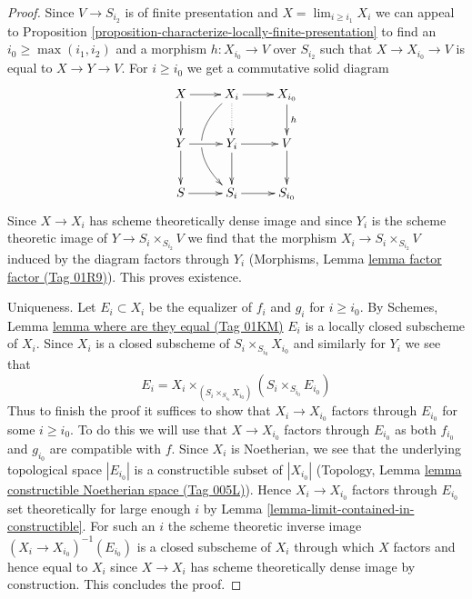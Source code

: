 \documentclass{amsart}
\theoremstyle{plain}
\theoremstyle{definition}
\theoremstyle{remark}
\numberwithin{equation}{subsection}
\def\lim{\mathop{\mathrm{lim}}\nolimits}
\begin{document}
\begin{proof}
Since $V \to S_{i_2}$ is of finite presentation and
$X = \lim_{i \geq i_1} X_i$ we can appeal to Proposition
\ref{proposition-characterize-locally-finite-presentation}
to find an $i_0 \geq \max(i_1, i_2)$ and a morphism $h : X_{i_0} \to V$
over $S_{i_2}$ such that $X \to X_{i_0} \to V$ is equal to $X \to Y \to V$.
For $i \geq i_0$ we get a commutative solid diagram
$$
\xymatrix{
X \ar[d] \ar[r] &
X_i \ar[r] \ar@{..>}[d] \ar@/_2pc/[dd] |!{[d];[ld]}\hole &
X_{i_0} \ar[d]^h \\
Y \ar[r] \ar[d] & Y_i \ar[r] \ar[d] & V \ar[d] \\
S \ar[r] & S_i \ar[r] & S_{i_0}
}
$$
Since $X \to X_i$ has scheme theoretically dense image
and since $Y_i$ is the scheme theoretic image of
$Y \to S_i \times_{S_{i_2}} V$
we find that the morphism $X_i \to S_i \times_{S_{i_2}} V$
induced by the diagram
factors through $Y_i$ (Morphisms, Lemma \href{https://stacks.math.columbia.edu/tag/01R9}{lemma factor factor (Tag 01R9)}).
This proves existence.

\medskip\noindent
Uniqueness. Let $E_i \subset X_i$ be the equalizer of $f_i$ and $g_i$
for $i \geq i_0$. By
Schemes, Lemma \href{https://stacks.math.columbia.edu/tag/01KM}{lemma where are they equal (Tag 01KM)}
$E_i$ is a locally closed subscheme of $X_i$.
Since $X_i$ is a closed subscheme of $S_i \times_{S_{i_0}} X_{i_0}$
and similarly for $Y_i$ we see that
$$
E_i = X_i \times_{(S_i \times_{S_{i_0}} X_{i_0})} (S_i \times_{S_{i_0}} E_{i_0})
$$
Thus to finish the proof it suffices to show that $X_i \to X_{i_0}$
factors through $E_{i_0}$ for some $i \geq i_0$.
To do this we will use that $X \to X_{i_0}$ factors through $E_{i_0}$
as both $f_{i_0}$ and $g_{i_0}$ are compatible with $f$.
Since $X_i$ is Noetherian, we see that the underlying
topological space $|E_{i_0}|$ is a constructible subset of $|X_{i_0}|$
(Topology, Lemma \href{https://stacks.math.columbia.edu/tag/005L}{lemma constructible Noetherian space (Tag 005L)}).
Hence $X_i \to X_{i_0}$ factors through $E_{i_0}$ set theoretically
for large enough $i$ by Lemma \ref{lemma-limit-contained-in-constructible}.
For such an $i$ the scheme theoretic inverse image
$(X_i \to X_{i_0})^{-1}(E_{i_0})$ is a closed subscheme of $X_i$
through which $X$ factors and hence equal to $X_i$ since
$X \to X_i$ has scheme theoretically dense image by construction.
This concludes the proof.
\end{proof}
\end{document}
